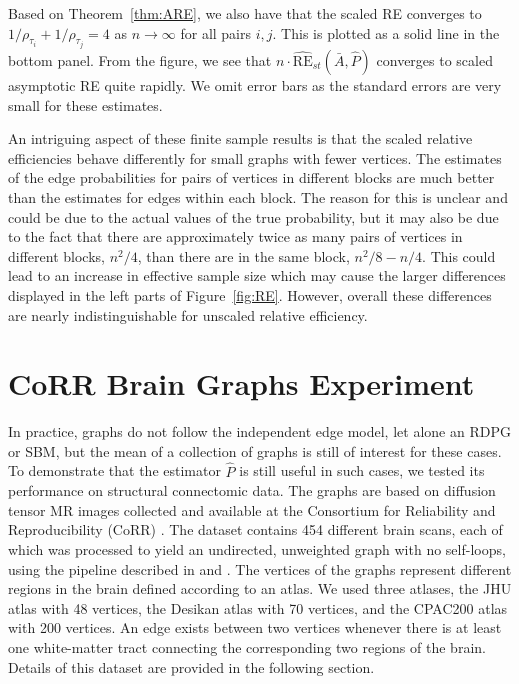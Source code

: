 Based on Theorem~\ref{thm:ARE}, we also have that the scaled RE converges to $1/\rho_{\tau_i}+1/\rho_{\tau_j}=4$ as $n \to\infty$ for all pairs $i,j$.
This is plotted as a solid line in the bottom panel.
From the figure, we see that $n \cdot \hat{\mathrm{RE}}_{st}(\bar{A}, \hat{P})$ converges to scaled asymptotic RE quite rapidly.
We omit error bars as the standard errors are very small for these estimates.

\begin{remark}
An intriguing aspect of these finite sample results is that the scaled relative efficiencies behave differently for small graphs with fewer vertices. 
The estimates of the edge probabilities for pairs of vertices in different blocks are much better than the estimates for edges within each block.
The reason for this is unclear and could be due to the actual values of the true probability, but it may also be due to the fact that there are approximately twice as many pairs of vertices in different blocks, $n^2/4$, than there are in the same block, $n^2/8-n/4$.
This could lead to an increase in effective sample size which may cause the larger differences displayed in the left parts of Figure~\ref{fig:RE}.
However, overall these differences are nearly indistinguishable for unscaled relative efficiency.
\end{remark}






\section{CoRR Brain Graphs Experiment}
\label{sec:LLG_corr_data}

In practice, graphs do not follow the independent edge model, let alone an RDPG or SBM, but the mean of a collection of graphs is still of interest for these cases.
To demonstrate that the estimator $\hat{P}$ is still useful in such cases, we tested its performance on structural connectomic data. 
The graphs are based on diffusion tensor MR images collected and available at the Consortium for Reliability and Reproducibility (CoRR) \citep{zuo2014open, gorgolewski2015high}.
The dataset contains 454 different brain scans, each of which was processed to yield an undirected, unweighted graph with no self-loops, using the pipeline described in \citet{roncal2013migraine} and \citet{kiar2016ndmg}.
The vertices of the graphs represent different regions in the brain defined according to an atlas.
We used three atlases, the JHU atlas with 48 vertices, the Desikan atlas with 70 vertices, and the  CPAC200 atlas with 200 vertices.
An edge exists between two vertices whenever there is at least one white-matter tract connecting the corresponding two regions of the brain. 
Details of this dataset are provided in the following section.



